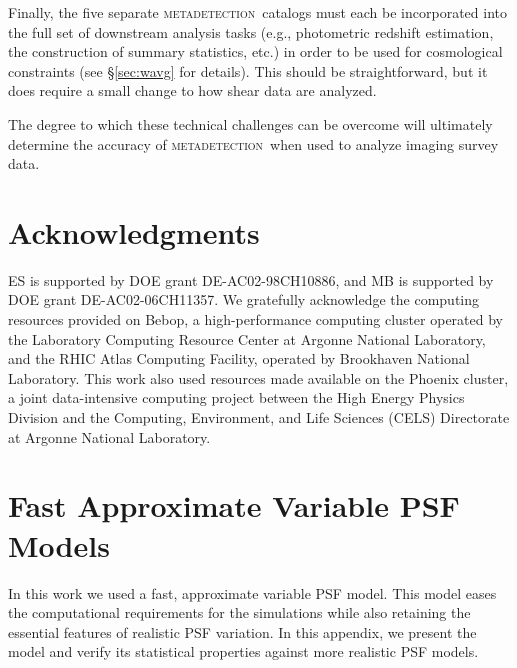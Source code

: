 \documentclass[iop, twocolappendix, appendixfloats, numberedappendix, apj]{hackemulateapj}
\newcommand{\mdet}{\textsc{metadetection}}
\begin{document}
Finally, the five separate \mdet\ catalogs must each be incorporated into the
full set of downstream analysis tasks (e.g., photometric redshift estimation,
the construction of summary statistics, etc.) in order to be used for
cosmological constraints (see \S \ref{sec:wavg} for details). This should be
straightforward, but it does require a small change to how shear data are
analyzed.


The degree to which these technical challenges can be overcome will ultimately
determine the accuracy of \mdet\ when used to analyze imaging survey data.


\section*{Acknowledgments}

ES is supported by DOE grant DE-AC02-98CH10886, and MB is supported by DOE
grant DE-AC02-06CH11357.  We gratefully acknowledge the computing resources
provided on Bebop, a high-performance computing cluster operated by the
Laboratory Computing Resource Center at Argonne National Laboratory, and the
RHIC Atlas Computing Facility, operated by Brookhaven National Laboratory.
This work also used resources made available on the Phoenix cluster, a joint
data-intensive computing project between the High Energy Physics Division and
the Computing, Environment, and Life Sciences (CELS) Directorate at Argonne
National Laboratory.


%
%
%
%



\appendix

\section{Fast Approximate Variable PSF Models}\label{app:pspsf}

In this work we used a fast, approximate variable PSF model. This model eases the
computational requirements for the simulations while also retaining the
essential features of realistic PSF variation. In this appendix, we present
the model and verify its statistical properties against more realistic PSF models.
\end{document}
